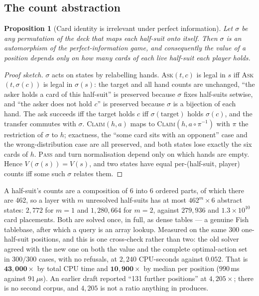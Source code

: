 \documentclass[11pt,a4paper]{article}
\newtheorem{proposition}{Proposition}
\begin{document}
\subsection{The count abstraction}

\begin{proposition}[Card identity is irrelevant under perfect information]
\label{prop:abstraction}
Let $\sigma$ be any permutation of the deck that maps each half-suit onto
itself. Then $\sigma$ is an automorphism of the perfect-information game, and
consequently the value of a position depends only on how many cards of each
live half-suit each player holds.
\end{proposition}

\begin{proof}[Proof sketch]
$\sigma$ acts on states by relabelling hands. \textsc{Ask}$(t,c)$ is legal in
$s$ iff \textsc{Ask}$(t,\sigma(c))$ is legal in $\sigma(s)$: the target and all
hand counts are unchanged, ``the asker holds a card of this half-suit'' is
preserved because $\sigma$ fixes half-suits setwise, and ``the asker does not
hold $c$'' is preserved because $\sigma$ is a bijection of each hand. The ask
succeeds iff the target holds $c$ iff $\sigma(\text{target})$ holds
$\sigma(c)$, and the transfer commutes with $\sigma$. \textsc{Claim}$(h,a)$ maps
to \textsc{Claim}$(h, a\circ\pi^{-1})$ with $\pi$ the restriction of $\sigma$ to
$h$; exactness, the ``some card sits with an opponent'' case and the
wrong-distribution case are all preserved, and both states lose exactly the six
cards of $h$. \textsc{Pass} and turn normalisation depend only on which hands
are empty. Hence $V(\sigma(s)) = V(s)$, and two states have equal
per-(half-suit, player) counts iff some such $\sigma$ relates them.
\end{proof}

A half-suit's counts are a composition of 6 into 6 ordered parts, of which there
are 462, so a layer with $m$ unresolved half-suits has at most $462^m \times 6$
abstract states: $2{,}772$ for $m=1$ and $1{,}280{,}664$ for $m=2$, against
$279{,}936$ and $1.3\times10^{10}$ card placements. Both are solved once, in
full, as dense tables --- a genuine Fish tablebase, after which a query is an
array lookup. Measured on the same $300$ one-half-suit positions, and this is
one cross-check rather than two: the old solver agreed with the new one on both
the value and the complete optimal-action set in $300/300$ cases, with no
refusals, at $2{,}240$ CPU-seconds against $0.052$. That is
$\mathbf{43{,}000\times}$ by total CPU time and
$\mathbf{10{,}900\times}$ by median per position ($990$\,ms against
$91\,\mu$s). An earlier draft reported ``131 further positions'' at
$4{,}205\times$; there is no second corpus, and $4{,}205$ is not a ratio
anything in  produces.
\end{document}
